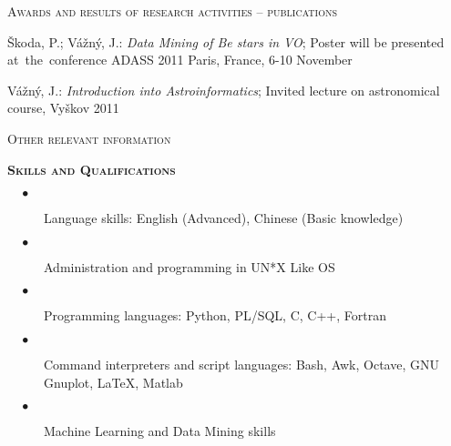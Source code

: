 \begin{cv}
\begin{cvlist}{\large \textsc{Awards and results of research activities -- publications}}
\item {Škoda}, P.; {Vážný}, J.: \textit{Data Mining of Be stars in VO};
    Poster will be presented at~the~conference ADASS 2011 Paris,
    France, 6-10 November 



\item {Vážný}, J.: \textit{Introduction into Astroinformatics};
  Invited lecture on astronomical course, Vyškov 2011



\end{cvlist}







\noindent\hrulefill
\begin{cvlist}{\large \textsc{Other relevant information}}



\item{\bf{\textsc{Skills and Qualifications}}}
\begin{description}
 \item[\hspace{-2mm} $\quad \bullet$ \hspace{-1.5mm}] Language skills: English (Advanced), Chinese (Basic knowledge)\\[-6mm]
 \item[\hspace{-2mm} $\quad \bullet$ \hspace{-1.5mm}] Administration
   and programming in UN*X Like OS\\[-6mm]
   \item[\hspace{-2mm} $\quad \bullet$ \hspace{-1.5mm}] Programming
     languages: Python, PL/SQL, C, C++, Fortran\\[-6mm]
  \item[\hspace{-2mm} $\quad \bullet$ \hspace{-1.5mm}] Command
    interpreters and script languages: Bash, Awk, Octave, GNU Gnuplot,
    LaTeX, Matlab\\[-6mm]
\item[\hspace{-2mm} $\quad \bullet$ \hspace{-1.5mm}] Machine Learning
  and Data Mining skills\\[-6mm]
\end{description}





\end{cvlist}
\end{cv}
